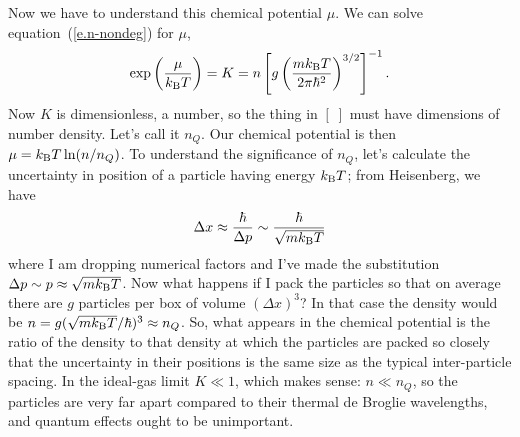 Now we have to understand this chemical potential $\mu$.  We can solve equation~(\ref{e.n-nondeg}) for $\mu$,
\begin{equation}\label{e.fugacity-nondeg}
\exp\left(\frac{\mu}{k_\mathrm{B} T}\right) = K = n\left[g\left(\frac{mk_\mathrm{B} T}{2\pi\hbar^{2}}\right)^{3/2}\right]^{-1}.
\end{equation}
Now $K$ is dimensionless, a number, so the thing in $[\;]$ must have dimensions of number density.  Let's call it $n_{Q}$.  Our chemical potential is then $\mu = k_\mathrm{B} T\ln(n/n_{Q})$.  To understand the significance of $n_{Q}$, let's calculate the uncertainty in position of a particle having energy $k_\mathrm{B} T$; from Heisenberg, we have
\[
\Delta x \approx \frac{\hbar}{\Delta p} \sim \frac{\hbar}{\sqrt{mk_\mathrm{B} T}}
\]
where I am dropping numerical factors and I've made the substitution $\Delta p\sim p \approx \sqrt{mk_\mathrm{B} T}$.  Now what happens if I pack the particles so that on average there are $g$ particles per box of volume $(\Delta x)^{3}$?  In that case the density would be $n = g(\sqrt{mk_\mathrm{B} T}/\hbar)^{3} \approx n_{Q}$.  So, what appears in the chemical potential is the ratio of the density to that density at which the particles are packed so closely that the uncertainty in their positions is the same size as the typical inter-particle spacing.
In the ideal-gas limit $K \ll 1$, which makes sense: $n\ll n_{Q}$, so the particles are very far apart compared to their thermal de Broglie wavelengths, and quantum effects ought to be unimportant.

